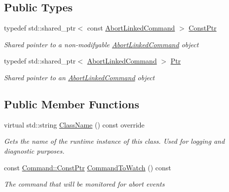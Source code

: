 \subsection*{Public Types}
\begin{DoxyCompactItemize}
\item 
typedef std\+::shared\+\_\+ptr$<$ const \mbox{\hyperlink{class_command_lib_1_1_abort_linked_command}{Abort\+Linked\+Command}} $>$ \mbox{\hyperlink{class_command_lib_1_1_abort_linked_command_a45ac62243ddc4bff695a1abba7363dd8}{Const\+Ptr}}
\begin{DoxyCompactList}\small\item\em Shared pointer to a non-\/modifyable \mbox{\hyperlink{class_command_lib_1_1_abort_linked_command}{Abort\+Linked\+Command}} object\end{DoxyCompactList}\item 
typedef std\+::shared\+\_\+ptr$<$ \mbox{\hyperlink{class_command_lib_1_1_abort_linked_command}{Abort\+Linked\+Command}} $>$ \mbox{\hyperlink{class_command_lib_1_1_abort_linked_command_acb916ab386f796250b4978538d9eabd8}{Ptr}}
\begin{DoxyCompactList}\small\item\em Shared pointer to an \mbox{\hyperlink{class_command_lib_1_1_abort_linked_command}{Abort\+Linked\+Command}} object\end{DoxyCompactList}\end{DoxyCompactItemize}
\subsection*{Public Member Functions}
\begin{DoxyCompactItemize}
\item 
\mbox{\label{class_command_lib_1_1_abort_linked_command_a014c2c8177e18e27f651aa122b58c90e}} 
virtual std\+::string \mbox{\hyperlink{class_command_lib_1_1_abort_linked_command_a014c2c8177e18e27f651aa122b58c90e}{Class\+Name}} () const override
\begin{DoxyCompactList}\small\item\em Gets the name of the runtime instance of this class. Used for logging and diagnostic purposes.  \end{DoxyCompactList}\item 
const \mbox{\hyperlink{class_command_lib_1_1_command_aee8fd78ff853a1f9c8e56959c3e81811}{Command\+::\+Const\+Ptr}} \mbox{\hyperlink{class_command_lib_1_1_abort_linked_command_ab61bc8cebde56e75016aa5bcea1ac175}{Command\+To\+Watch}} () const
\begin{DoxyCompactList}\small\item\em The command that will be monitored for abort events\end{DoxyCompactList}\end{DoxyCompactItemize}
